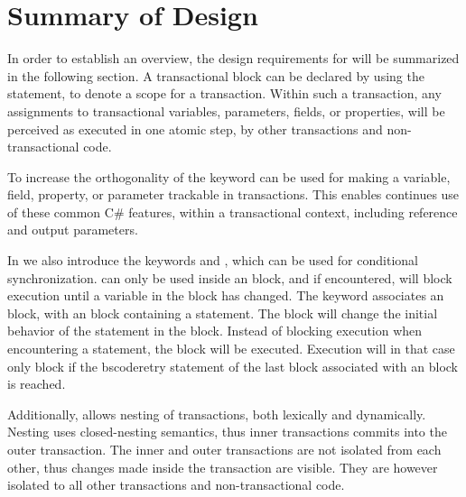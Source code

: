 \section{Summary of Design}\label{sec:summary_design}
In order to establish an overview, the design requirements for \stmnamesp will be summarized in the following section. A transactional block can be declared by using the  statement, to denote a scope for a transaction. Within such a transaction, any assignments to transactional variables, parameters, fields, or properties, will be perceived as executed in one atomic step, by other transactions and non-transactional code. 

To increase the orthogonality of \stmname the  keyword can be used for making a variable, field, property, or parameter trackable in transactions. This enables continues use of these common C\# features, within a transactional context, including reference and output parameters.

In \stmnamesp we also introduce the keywords  and , which can be used for conditional synchronization.  can only be used inside an  block, and if encountered, will block execution until a variable in the  block has changed. The  keyword associates an  block, with an  block containing a  statement. The  block will change the initial behavior of the  statement in the  block. Instead of blocking execution when encountering a  statement, the  block will be executed. Execution will in that case only block if the bscode{retry} statement of the last  block associated with an  block is reached.

Additionally, \stmnamesp allows nesting of transactions, both lexically and dynamically. Nesting uses closed-nesting semantics, thus inner transactions commits into the outer transaction. The inner and outer transactions are not isolated from each other, thus changes made inside the transaction are visible. They are however isolated to all other transactions and non-transactional code.


%
%
%
%    
%
%    
         
         



\worksheetend
